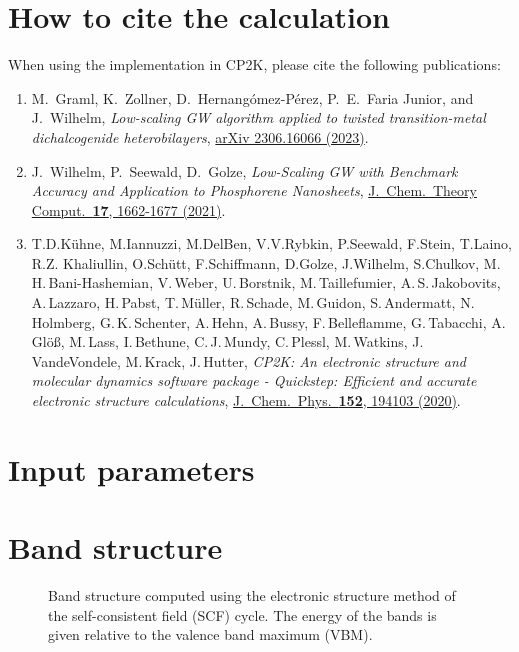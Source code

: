 \documentclass[11pt, a4paper]{scrartcl}
\newlength\figureheight
\newlength\figurewidth
\begin{document}
\section{How to cite the \GW calculation}
When using the \GW implementation in CP2K, please cite the following publications:
\begin{enumerate}[leftmargin=*]

\item M.~Graml, K.~Zollner, D.~Hernangómez-Pérez, P.~E.~Faria Junior, and J.~Wilhelm, \textit{Low-scaling GW algorithm applied to twisted transition-metal dichalcogenide heterobilayers}, \href{
https://doi.org/10.48550/arXiv.2306.16066}{arXiv 2306.16066 (2023)}.

\item J.~Wilhelm, P.~Seewald, D.~Golze, \textit{Low-Scaling GW with Benchmark Accuracy and Application to Phosphorene Nanosheets}, \href{https://doi.org/10.1021/acs.jctc.0c01282}{
J.~Chem.~Theory Comput.~\textbf{17}, 1662-1677 (2021)}.


\item T.\;D.\;Kühne, M.\;Iannuzzi, M.\;Del\;Ben, V.\;V.\;Rybkin, P.\;Seewald, F.\;Stein, T.\;Laino, R.\;Z. Khaliullin, O.\;Schütt, F.\;Schiffmann, D.\;Golze, J.\;Wilhelm, S.\;Chulkov, M.\,H.\,Bani-Hashe\-mian, V.\,Weber, \linebreak U.\,Borst\-nik, M.\,Taillefumier, A.\,S.\,Jakobovits, A.\,Lazzaro, H.\,Pabst,  T.\,Müller,  R.\,Schade, M.\,Guidon, S.\,Ander\-matt, N.\,Holmberg, G.\,K.\,Schenter, A.\,Hehn, A.\,Bussy,  F.\,Belleflamme, G.\,Tabacchi, A.\,Glöß, M.\,Lass, I.\,Bethune, C.\,J.\,Mundy, C.\,Plessl, M.\,Watkins, J.\,VandeVondele, M.\,Krack, J.\,Hutter, \textit{CP2K: An electronic structure and molecular dynamics software package - Quickstep: Efficient and accurate electronic structure calculations}, \href{https://doi.org/10.1063/5.0007045}{J.~Chem.~Phys.~\textbf{152}, 194103 (2020)}.


\end{enumerate}

\section{Input parameters}


\section{Band structure}
\begin{figure}[b!]
\centering
\setlength\figureheight{12cm} 
\setlength\figurewidth{\textwidth}

\caption{Band structure computed using the electronic structure method of the self-consistent field (SCF) cycle. The energy of the bands is given relative to the valence band maximum (VBM).}
    \label{fig:Efield}
\end{figure}
\end{document}
